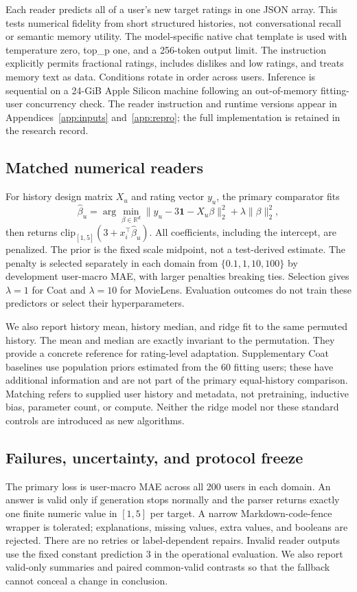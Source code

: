 \documentclass{article}
\newcommand{\R}{\mathbb{R}}
\begin{document}
Each reader predicts all of a user's new target ratings in one JSON array. This tests numerical fidelity from short structured histories, not conversational recall or semantic memory utility. The model-specific native chat template is used with temperature zero, top\_p one, and a 256-token output limit. The instruction explicitly permits fractional ratings, includes dislikes and low ratings, and treats memory text as data. Conditions rotate in order across users. Inference is sequential on a 24-GiB Apple Silicon machine following an out-of-memory fitting-user concurrency check. The reader instruction and runtime versions appear in Appendices~\ref{app:inputs} and~\ref{app:repro}; the full implementation is retained in the research record.

\subsection{Matched numerical readers}
For history design matrix $X_u$ and rating vector $y_u$, the primary comparator fits
\begin{equation}
 \hat\beta_u=\arg\min_{\beta\in\R^d}
 \|y_u-3\mathbf1-X_u\beta\|_2^2+\lambda\|\beta\|_2^2,
\end{equation}
then returns $\mathrm{clip}_{[1,5]}(3+x_i^\top\hat\beta_u)$. All coefficients, including the intercept, are penalized. The prior is the fixed scale midpoint, not a test-derived estimate. The penalty is selected separately in each domain from $\{0.1,1,10,100\}$ by development user-macro MAE, with larger penalties breaking ties. Selection gives $\lambda=1$ for Coat and $\lambda=10$ for MovieLens. Evaluation outcomes do not train these predictors or select their hyperparameters.

We also report history mean, history median, and ridge fit to the same permuted history. The mean and median are exactly invariant to the permutation. They provide a concrete reference for rating-level adaptation. Supplementary Coat baselines use population priors estimated from the 60 fitting users; these have additional information and are not part of the primary equal-history comparison. Matching refers to supplied user history and metadata, not pretraining, inductive bias, parameter count, or compute. Neither the ridge model nor these standard controls are introduced as new algorithms.

\subsection{Failures, uncertainty, and protocol freeze}
The primary loss is user-macro MAE across all 200 users in each domain. An answer is valid only if generation stops normally and the parser returns exactly one finite numeric value in $[1,5]$ per target. A narrow Markdown-code-fence wrapper is tolerated; explanations, missing values, extra values, and booleans are rejected. There are no retries or label-dependent repairs. Invalid reader outputs use the fixed constant prediction 3 in the operational evaluation. We also report valid-only summaries and paired common-valid contrasts so that the fallback cannot conceal a change in conclusion.
\end{document}
